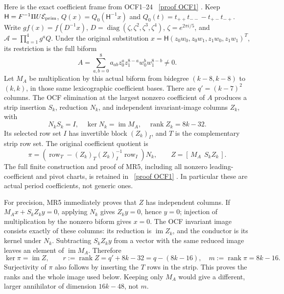 \documentclass[11pt]{article}
\begin{document}
Here is the exact coefficient frame from OCF1--24 \cite{mrroot:OCF}%
~\href{https://github.com/KokunoYumeto/zeta-function-research-reader/blob/5992ad50c0f2a06921f1fcaded7b4e38097c0739/workbenches/splitzero-tandem/continuations/20260920-original-kernel-mixed-determinants/providers/ORIGINAL_CONDUCTOR_STRIP_FRAME.tex\#L27}{[proof OCF1]}%
{}.
Keep $\mathsf H=F^{-1}\Pi U\mathcal E_{\rm prim}$,
$Q(x)=Q_0(\mathsf H^{-1}x)$ and
$Q_0(t)=t_{++}t_{--}-t_{+-}t_{-+}$.
Write $g f(x)=f(D^{-1}x)$,
$D=\operatorname{diag}(\zeta,\zeta^2,\zeta^3,\zeta^4)$,
$\zeta=e^{2\pi i/5}$, and $\mathcal A=\prod_{a=1}^4g^aQ$.
Under the original substitution
$x=\mathsf H(z_0w_0,z_0w_1,z_1w_0,z_1w_1)^T$, its restriction is the
full biform
\[
 A=\sum_{a,b=0}^8a_{ab}z_0^az_1^{8-a}w_0^bw_1^{8-b}\ne0.
 \tag{MR4}
\]
Let $M_A$ be multiplication by this actual biform from bidegree
$(k-8,k-8)$ to $(k,k)$, in those same lexicographic coefficient bases.
There are $q'=(k-7)^2$ columns. The OCF elimination at the largest
nonzero coefficient of $A$ produces a strip insertion $S_k$, reduction
$N_k$, and independent invariant-image columns $Z_k$, with
\[
 N_kS_k=I,\quad \ker N_k=\operatorname{im}M_A,\quad
 \operatorname{rank}Z_k=8k-32.\tag{MR5}
\]
Its selected row set $I$ has invertible block $(Z_k)_I$, and $T$ is
the complementary strip row set. The original coefficient quotient is
\[
 \pi=(\operatorname{row}_T-(Z_k)_T(Z_k)_I^{-1}
                   \operatorname{row}_I)N_k,
 \qquad Z=[\,M_A\ \ S_kZ_k\,].\tag{MR6}
\]
The full finite construction and proof of MR5, including all nonzero
leading-coefficient and pivot charts, is retained in \cite{mrroot:OCF}%
~\href{https://github.com/KokunoYumeto/zeta-function-research-reader/blob/5992ad50c0f2a06921f1fcaded7b4e38097c0739/workbenches/splitzero-tandem/continuations/20260920-original-kernel-mixed-determinants/providers/ORIGINAL_CONDUCTOR_STRIP_FRAME.tex\#L27}{[proof OCF1]}%
{}.
In particular these are actual period coefficients, not generic ones.

For precision, MR5 immediately proves that $Z$ has independent columns.
If $M_Ax+S_kZ_ky=0$, applying $N_k$ gives $Z_ky=0$, hence $y=0$;
injection of multiplication by the nonzero biform gives $x=0$.
The OCF invariant image consists exactly of these columns: its reduction
is $\operatorname{im}Z_k$, and the conductor is its kernel under $N_k$.
Subtracting $S_kZ_ky$ from a vector with the same reduced image leaves
an element of $\operatorname{im}M_A$. Therefore
\[
 \ker\pi=\operatorname{im}Z,\qquad
 r:=\operatorname{rank}Z=q'+8k-32=q-(8k-16),
 \quad m:=\operatorname{rank}\pi=8k-16.\tag{MR7}
\]
Surjectivity of $\pi$ also follows by inserting the $T$ rows in the
strip. This proves the ranks and the whole image used below. Keeping
only $M_A$ would give a different, larger annihilator of dimension
$16k-48$, not $m$.
\end{document}
